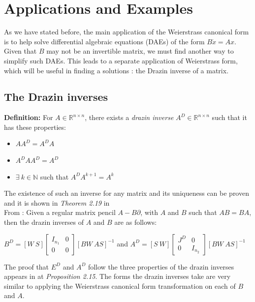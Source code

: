 \section{Applications and Examples}

As we have stated before, the main application of the Weierstrass canonical form is to help solve differential algebraic equations (DAEs) of the form  $B\dot{x} = Ax$. Given that $B$ may not be an invertible matrix, we must find another way to simplify such DAEs. This leads to a separate application of Weierstrass form, which will be useful in finding a solutions : the Drazin inverse of a matrix.

\subsection{The Drazin inverses}

\textbf{Definition:} For $A \in \mathbb{R}^{n \times n}$, there exists a \textit{drazin inverse} $A^D \in \mathbb{R}^{n \times n}$ such that it has these properties:
\begin{itemize}
    \item $A A^D = A^D A$
    \item $A^DAA^D = A^D$
    \item $\exists\ k \in \mathbb{N}$ such that $A^DA^{k+1} = A^k$
\end{itemize}
The existence of such an inverse for any matrix and its uniqueness can be proven and it is shown in \textit{Theorem 2.19} in \cite{kunkel2006differential}
\\From \cite{berger2012quasi}: Given a regular matrix pencil $A - B\partial$, with $A$ and $B$ such that $AB = BA$, then the drazin inverses of $A$ and $B$ are as follows:
\begin{center}
    $B^D = [W\ S] \begin{bmatrix} I_{n_1} & 0 \\ 0 & 0 \end{bmatrix} [BW\ AS]^{-1}$
    and
    $A^D = [S\ W] \begin{bmatrix} J^D & 0 \\ 0 & I_{n_2} \end{bmatrix} [BW\ AS]^{-1}$
\end{center}

The proof that $E^D$ and $A^D$ follow the three properties of the drazin inverses appears in \cite{berger2012quasi} at \textit{Proposition 2.15}. The forms the drazin inverses take are very similar to applying the Weierstrass canonical form transformation on each of $B$ and $A$.

